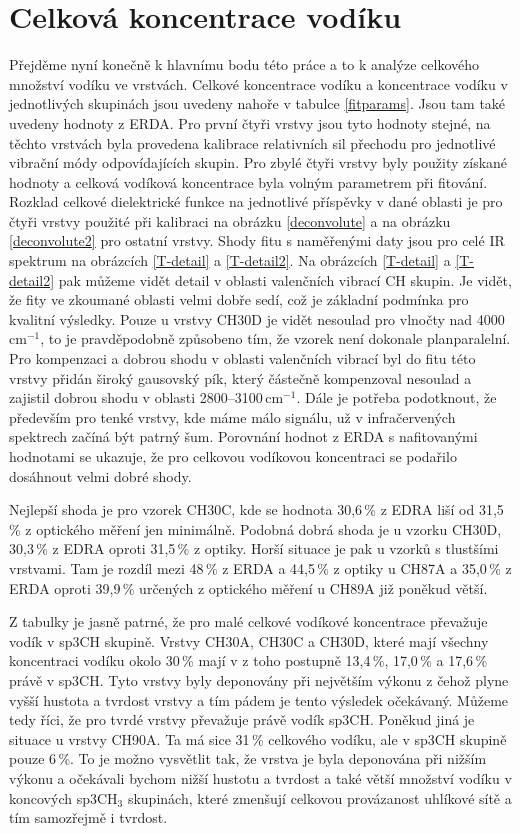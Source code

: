 \section{Celková koncentrace vodíku}
Přejděme nyní konečně k hlavnímu bodu této práce a to k analýze celkového množství vodíku ve vrstvách. Celkové koncentrace vodíku a koncentrace vodíku v jednotlivých skupinách jsou uvedeny nahoře v tabulce \ref{fitparams}. 
Jsou tam také uvedeny hodnoty z ERDA. Pro první čtyři vrstvy jsou tyto hodnoty stejné, na těchto vrstvách byla provedena kalibrace relativních sil přechodu pro jednotlivé vibrační módy odpovídajících skupin. 
Pro zbylé čtyři vrstvy byly použity získané hodnoty a celková vodíková koncentrace byla volným parametrem při fitování. Rozklad celkové dielektrické funkce na jednotlivé příspěvky v dané oblasti je pro čtyři vrstvy použité při kalibraci na obrázku \ref{deconvolute} a na obrázku \ref{deconvolute2} pro ostatní vrstvy. 
Shody fitu s naměřenými daty jsou pro celé IR spektrum na obrázcích \ref{T-detail} a \ref{T-detail2}. Na obrázcích \ref{T-detail} a \ref{T-detail2} pak můžeme vidět detail v oblasti valenčních vibrací CH skupin. Je vidět, že fity ve zkoumané oblasti velmi dobře sedí, což je základní podmínka pro kvalitní výsledky. Pouze u vrstvy CH30D je vidět nesoulad pro vlnočty nad 4000\,cm$^{-1}$, to je pravděpodobně způsobeno tím, že vzorek není dokonale planparalelní. Pro kompenzaci a dobrou shodu v oblasti valenčních vibrací byl do fitu této vrstvy přidán široký gausovský pík, který částečně kompenzoval nesoulad a zajistil dobrou shodu v oblasti 2800--3100\,cm$^{-1}$. Dále je potřeba podotknout, že především pro tenké vrstvy, kde máme málo signálu, už v infračervených spektrech začíná být patrný šum.  
Porovnání hodnot z ERDA s nafitovanými hodnotami se ukazuje, že pro celkovou vodíkovou koncentraci se podařilo dosáhnout velmi dobré shody.

Nejlepší shoda je pro vzorek CH30C, kde se hodnota 30,6\,\% z EDRA liší od 31,5\,\% z optického měření jen minimálně. Podobná dobrá shoda je u vzorku CH30D, 30,3\,\% z EDRA oproti 31,5\,\% z optiky. Horší situace je pak u vzorků s tlustšími vrstvami. Tam je rozdíl mezi 48\,\% z ERDA a 44,5\,\% z optiky u CH87A a 35,0\,\% z ERDA oproti 39,9\,\% určených z optického měření u CH89A již poněkud větší.

Z tabulky je jasně patrné, že pro malé celkové vodíkové koncentrace převažuje vodík v sp3CH skupině. Vrstvy CH30A, CH30C a CH30D, které mají všechny koncentraci vodíku okolo 30\,\% mají v z toho postupně 13,4\,\%, 17,0\,\% a 17,6\,\% právě v sp3CH. Tyto vrstvy byly deponovány při největším výkonu z čehož plyne vyšší hustota a tvrdost vrstvy a tím pádem je tento výsledek očekávaný. 
Můžeme tedy říci, že pro tvrdé vrstvy převažuje právě vodík sp3CH. Poněkud jiná je situace u vrstvy CH90A. Ta má sice 31\,\% celkového vodíku, ale v sp3CH skupině pouze 6\,\%. To je možno vysvětlit tak, že vrstva je byla deponována při nižším výkonu a očekávali bychom nižší hustotu a tvrdost a také větší množství vodíku v koncových sp3CH$_3$ skupinách, které zmenšují celkovou provázanost uhlíkové sítě a tím samozřejmě i tvrdost. 

